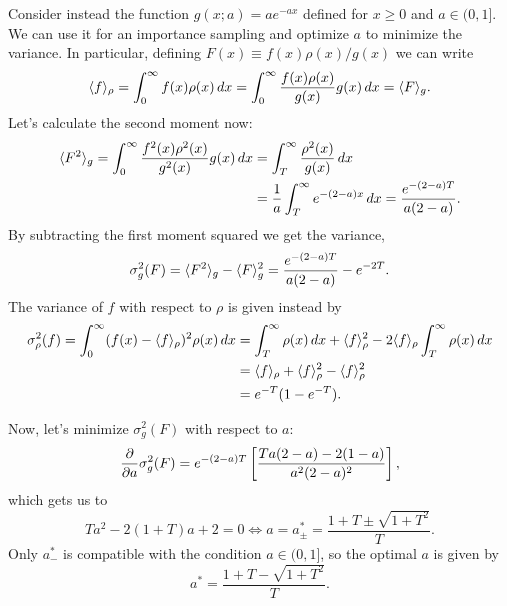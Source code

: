 Consider instead the function $g(x; a) = ae^{-ax}$ defined for $x \geq 0$ and $a
\in (0, 1]$. We can use it for an importance sampling and optimize $a$ to
minimize the variance. In particular, defining $F(x) \equiv f(x) \rho(x) / g(x)$
we can write
\begin{equation}
    \langle f\rangle_{\rho} = \int_{0}^{\infty} f(x) \rho(x) \, dx = 
    \int_{0}^{\infty} \frac{f(x)\rho(x)}{g(x)} g(x) \, dx = 
    \langle F\rangle_{g}.
\end{equation}
Let’s calculate the second moment now:
\begin{equation}
\begin{split}
    \langle F^{2}\rangle_{g} = \int_{0}^{\infty} \frac{f^{2}(x) \rho^2(x)}{g^{2}(x)}
    g(x) \, dx &= \int_{T}^{\infty} \frac{\rho^{2}(x)}{g(x)}\, dx \\
    &= \frac{1}{a} \int_{T}^{\infty} e^{-(2-a) x} \, dx =
    \frac{e^{-(2-a)T}}{a(2-a)}.
\end{split}
\end{equation}
By subtracting the first moment squared we get the variance,
\begin{equation}
    \sigma^{2}_g(F) = \langle F^{2}\rangle_g - \langle F\rangle_{g}^{2}
    = \frac{e^{-(2-a)T}}{a(2-a)} - e^{-2T}.
\end{equation}
The variance of $f$ with respect to $\rho$ is given instead by
\begin{equation}
\begin{split}
    \sigma^{2}_{\rho}(f)
    = \int_{0}^{\infty} (f(x) - \langle f\rangle_{\rho})^{2} \rho(x) \, dx
    &= \int_{T}^{\infty} \rho(x) \, dx + \langle f\rangle_{\rho}^{2}
        - 2 \langle f\rangle_{\rho} \int_{T}^{\infty} \rho(x) \, dx \\
    &= \langle f\rangle_{\rho} + \langle f\rangle^{2}_{\rho} - \langle f\rangle^{2}_{\rho} \\
    &= e^{-T}(1 - e^{-T}).
\end{split}
\end{equation}

Now, let’s minimize $\sigma^{2}_g(F)$ with respect to $a$:
\begin{equation}
    \pdiff{}{a} \sigma^{2}_{g}(F) = e^{-(2-a)T} \left[\frac{Ta(2-a) -
    2(1-a)}{a^{2}(2-a)^{2}}\right],
\end{equation}
which gets us to
\begin{equation}
    Ta^{2} - 2(1 + T) a + 2 = 0 \iff a = a^*_{\pm}
    = \frac{1 + T \pm \sqrt{1 + T^{2}}}{T}.
\end{equation}
Only $a^*_{-}$ is compatible with the condition $a \in (0, 1]$, so the optimal
$a$ is given by
\begin{equation}
    a^* = \frac{1 + T - \sqrt{1 + T^{2}}}{T}.
\end{equation}

